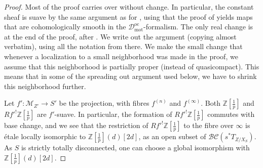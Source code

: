 \documentclass[11pt]{amsart}
\numberwithin{equation}{section}
\numberwithin{theorem}{section}
\theoremstyle{definition}
\newcommand{\BC}{\mathcal{BC}}
\begin{document}
\begin{proof} Most of the proof carries over without change. In particular, the constant sheaf is suave by the same argument as for \cite[Proposition IV.4.27]{FarguesScholze}, using that the proof of \cite[Lemma IV.4.28]{FarguesScholze} yields maps that are cohomologically smooth in the $\mathcal D_{\mathrm{mot}}^{\mathrm{oc}}$-formalism. The only real change is at the end of the proof, after \cite[Lemma IV.4.30]{FarguesScholze}. We write out the argument (copying almost verbatim), using all the notation from there. We make the small change that whenever a localization to a small neighborhood was made in the proof, we assume that this neighborhood is partially proper (instead of quasicompact). This means that in some of the spreading out argument used below, we have to shrink this neighborhood further.

Let $f': \mathcal M_{Z'}\to S'$ be the projection, with fibres $f^{(n)}$ and $f^{(\infty)}$. Both $\mathbb Z[\tfrac 1p]$ and $Rf'^! \mathbb Z[\tfrac 1p]$ are $f'$-suave. In particular, the formation of $Rf'^! \mathbb Z[\tfrac 1p]$ commutes with base change, and we see that the restriction of $Rf'^!\mathbb Z[\tfrac 1p]$ to the fibre over $\infty$ is \'etale locally isomorphic to $\mathbb Z[\tfrac 1p](d)[2d]$, as an open subset of $\BC(s^\ast T_{Z/X_S})$. As $S$ is strictly totally disconnected, one can choose a global isomorphism with $\mathbb Z[\tfrac 1p](d)[2d]$.


\end{proof}
\end{document}
